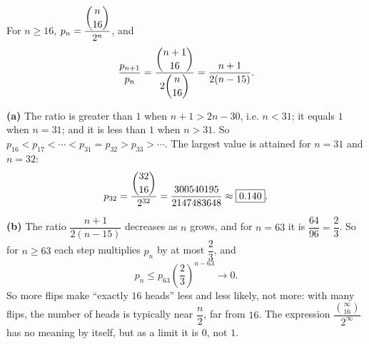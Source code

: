 For $n\ge16$, $p_n=\dfrac{\dbinom{n}{16}}{2^n}$, and
\[\dfrac{p_{n+1}}{p_n}=\dfrac{\dbinom{n+1}{16}}{2\dbinom{n}{16}}=\dfrac{n+1}{2(n-15)}.\]

\textbf{(a)} The ratio is greater than $1$ when $n+1>2n-30$, i.e. $n<31$; it equals $1$ when $n=31$; and it is less than $1$ when $n>31$. So $p_{16}<p_{17}<\cdots<p_{31}=p_{32}>p_{33}>\cdots$. The largest value is attained for $n=31$ and $n=32$:
\[p_{32}=\dfrac{\dbinom{32}{16}}{2^{32}}=\dfrac{300540195}{2147483648}\approx\boxed{0.140}.\]

\textbf{(b)} The ratio $\dfrac{n+1}{2(n-15)}$ decreases as $n$ grows, and for $n=63$ it is $\dfrac{64}{96}=\dfrac23$. So for $n\ge63$ each step multiplies $p_n$ by at most $\dfrac23$, and
\[p_n\le p_{63}\left(\dfrac23\right)^{n-63}\to0.\]
So more flips make ``exactly $16$ heads'' less and less likely, not more: with many flips, the number of heads is typically near $\dfrac n2$, far from $16$. The expression $\dfrac{\binom{\infty}{16}}{2^\infty}$ has no meaning by itself, but as a limit it is $0$, not $1$.
